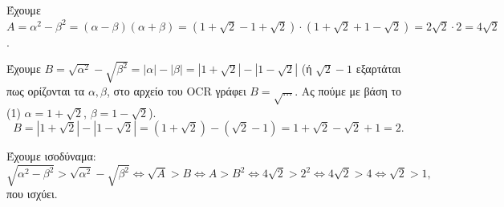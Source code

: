 
\begin{alist}
\item Έχουμε $A = \alpha^2 - \beta^2 = (\alpha - \beta)(\alpha + \beta) = (1 + \sqrt{2} - 1 + \sqrt{2}) \cdot (1 + \sqrt{2} + 1 - \sqrt{2}) = 2\sqrt{2} \cdot 2 = 4\sqrt{2}$.

\item Έχουμε $B = \sqrt{\alpha^2} - \sqrt{\beta^2} = |\alpha| - |\beta| = |1 + \sqrt{2}| - |1 - \sqrt{2}|$ (ή $\sqrt{2}-1$ εξαρτάται πως ορίζονται τα $\alpha, \beta$, 
στο αρχείο του OCR γράφει $B = \sqrt{\dots}$.  Ας πούμε με βάση το (1) $\alpha=1+\sqrt{2}$, $\beta=1-\sqrt{2}$).
\[B = |1 + \sqrt{2}| - |1 - \sqrt{2}| = (1 + \sqrt{2}) - (\sqrt{2} - 1) = 1 + \sqrt{2} - \sqrt{2} + 1 = 2.\]

\item Έχουμε ισοδύναμα:
\[\sqrt{\alpha^2 - \beta^2} > \sqrt{\alpha^2} - \sqrt{\beta^2} \Leftrightarrow \sqrt{A} > B \Leftrightarrow A > B^2 \Leftrightarrow 4\sqrt{2} > 2^2 \Leftrightarrow 4\sqrt{2} > 4 \Leftrightarrow \sqrt{2} > 1,\]
που ισχύει.
\end{alist}

